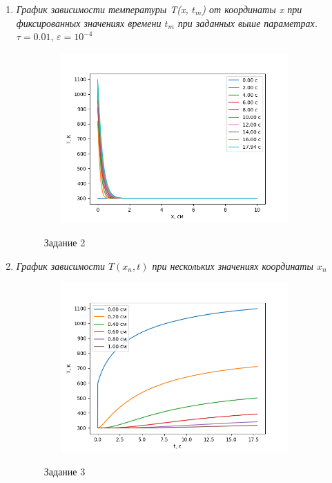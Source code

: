 \begin{enumerate}
	
	\newpage
	\item \textit{График зависимости температуры T(x, $t_m$) от координаты x при фиксированных значениях времени $t_m$ при заданных выше параметрах.}\\
	
	$\tau = 0.01$, $\varepsilon = 10^{-4}$
	
	\begin{figure}[h]
		\begin{center}
			{\includegraphics[height=6.5cm, width = 10cm]{../pictures/Figure_1}}
			\caption{Задание 2}
		\end{center}
	\end{figure}

	\item\textit{График зависимости $T(x_n, t)$ при нескольких значениях координаты $x_n$}
	\begin{figure}[h]
		\begin{center}
			{\includegraphics[height=6.5cm, width = 10cm]{../pictures/Figure_2}}
			\caption{Задание 3}
		\end{center}
	\end{figure}
	
\end{enumerate}